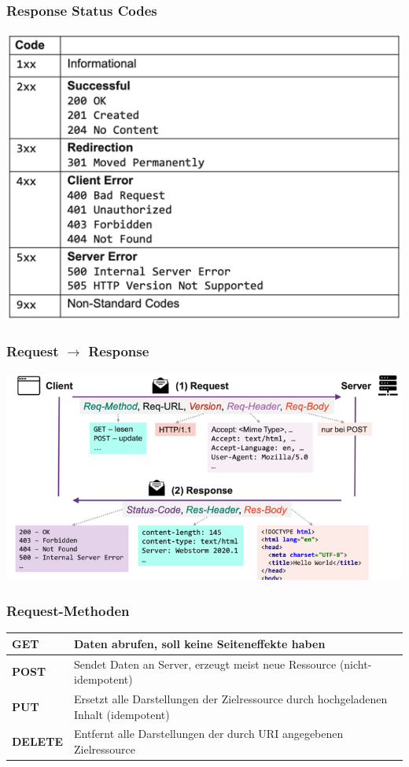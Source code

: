 \documentclass[a4paper, landscape, 8pt]{scrartcl}
\begin{document}
\begin{multicols*}{4}
        \subsubsection{Response Status Codes}
        \includegraphics[width=\columnwidth]{graphic/38-http-status-codes}

        \subsubsection{Request $\to$ Response}
        \includegraphics[width=\columnwidth]{graphic/20-request-response}

        \subsubsection{Request-Methoden}
        \begin{tabularx}{\columnwidth}{l | X}
            \textbf{GET} & Daten abrufen, soll keine Seiteneffekte haben \\
            \hline
            \textbf{POST} & Sendet Daten an Server, erzeugt meist neue Ressource (nicht-idempotent) \\
            \hline
            \textbf{PUT} & Ersetzt alle Darstellungen der Zielressource durch hochgeladenen Inhalt (idempotent) \\
            \hline
            \textbf{DELETE} & Entfernt alle Darstellungen der durch URI angegebenen Zielressource
        \end{tabularx}


\end{multicols*}
\end{document}
